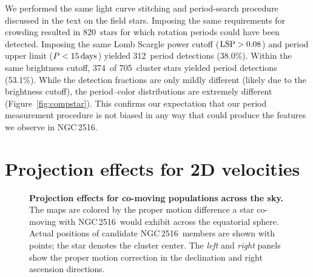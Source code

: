 \documentclass[12pt,twocolumn,tighten]{aastex63}
\newcommand{\cn}{NGC\,2516} %
\newcommand{\ncompstardenominator}{820} %
\newcommand{\ncompstarnumerator}{312} %
\newcommand{\ncompfrac}{38.0\%} %
\newcommand{\nautovscompstardenominator}{705} %
\newcommand{\nautovscompstarnumerator}{374} %
\newcommand{\nautofrac}{53.1\%} %
\begin{document}
We performed the same light curve stitching and period-search
procedure discussed in the text on the field stars.
Imposing the same requirements for crowding resulted in
\ncompstardenominator\ stars for which rotation periods could have
been detected.  Imposing the same Lomb Scargle power cutoff (${\rm
LSP}>0.08$) and period upper limit ($P<15\,{\rm days}$) yielded
\ncompstarnumerator\ period detections (\ncompfrac).  Within the same
brightness cutoff, \nautovscompstarnumerator\ of
\nautovscompstardenominator\ cluster stars yielded period detections
(\nautofrac).  While the detection fractions are only mildly
different (likely due to the brightness cutoff), the period--color
distributions are extremely different
(Figure~\ref{fig:compstar}).
This confirms our expectation that our period measurement procedure is
not biased in any way that could produce the features we observe in
\cn.


\section{Projection effects for 2D velocities}
\label{app:vproj}

\begin{figure}[t]
	\begin{center}
		\leavevmode
	\end{center}
	\vspace{-0.5cm}
  \caption{ {\bf Projection effects for co-moving populations across
  the sky.} The maps are colored by the proper motion difference a star
  co-moving with \cn\ would exhibit across the equatorial sphere.
  Actual positions of candidate \cn\ members are shown with points;
  the star denotes the cluster center.
  The {\it left} and {\it right} panels show the proper motion correction in
  the declination and right ascension directions.
	\label{fig:vproj}
	}
\end{figure}
\end{document}
